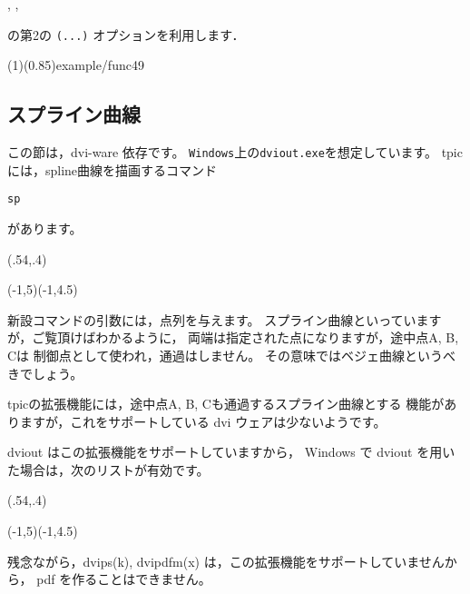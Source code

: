 \centerline{, , }
の第2の \texttt{(...)} オプションを利用します．

\showexample[グラフの点線描画](1)(0.85){example/func49}


\subsection{スプライン曲線}
\bgroup
この節は，dvi-ware 依存です。
\texttt{Windows}上の\texttt{dviout.exe}を想定しています。
\textsf{tpic}には，\textsf{spline}曲線を描画するコマンド
\begin{jquote}
\begin{verbatim}
sp
\end{verbatim}
\end{jquote}
があります。

%
\begin{showEx}(.54,.4){}
\begin{zahyou}[ul=8mm](-1,5)(-1,4.5)
  \zahyouMemori[g]
  \Drawtpic{\O\A\B\C\D}
  \kuromaru{\O;\A;\B;\C;\D}
\end{zahyou}
\end{showEx}

新設コマンドの引数には，点列を与えます。
スプライン曲線といっていますが，ご覧頂けばわかるように，
両端は指定された点になりますが，途中点A, B, Cは
制御点として使われ，通過はしません。
その意味ではベジェ曲線というべきでしょう。

\textsf{tpic}の拡張機能には，途中点A, B, Cも通過するスプライン曲線とする
機能がありますが，これをサポートしている dvi ウェアは少ないようです。

dviout はこの拡張機能をサポートしていますから，
Windows で dviout を用いた場合は，次のリストが有効です。

\begin{showEx}(.54,.4){}
\begin{zahyou}[ul=8mm](-1,5)(-1,4.5)
  \zahyouMemori[g]
  \Drawtpic[tpicBz=0]{\O\A\B\C\D}
  \kuromaru{\O;\A;\B;\C;\D}
\end{zahyou}
\end{showEx}

残念ながら，dvips(k), dvipdfm(x) は，この拡張機能をサポートしていませんから，
pdf を作ることはできません。
\egroup
